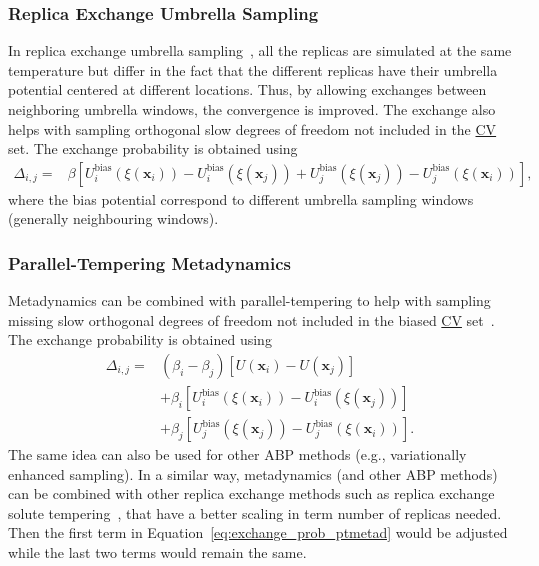 \documentclass[9pt,review]{livecoms}
\newcommand{\vx}{\mathbf{x}}
\begin{document}
\subsubsection{Replica Exchange Umbrella Sampling}
\label{sec:repex_umbrsampl}
In replica exchange umbrella sampling~\cite{Sugita2000_REUS}, all the replicas are simulated at the same temperature but differ in the fact that the different replicas have their umbrella potential centered at different locations. Thus, by allowing exchanges between neighboring umbrella windows, the convergence is improved. The exchange also helps with sampling orthogonal slow degrees of freedom not included in the \hyperlink{ref:CV} {CV} set. The exchange probability is obtained using
\begin{align}
\Delta_{i,j} = &
\beta \left[
U^{\mathrm{bias}}_{i}(\xi(\vx_{i})) - U^{\mathrm{bias}}_{i}(\xi(\vx_{j})) +
U^{\mathrm{bias}}_{j}(\xi(\vx_{j})) - U^{\mathrm{bias}}_{j}(\xi(\vx_{i}))
\right],
\end{align}
where the bias potential correspond to different umbrella sampling windows (generally neighbouring windows). 

\subsubsection{Parallel-Tempering Metadynamics}
Metadynamics can be combined with parallel-tempering to help with sampling missing slow orthogonal degrees of freedom not included in the biased \hyperlink{ref:CV} {CV} set~\cite{Bussi-JACS-2006}. The exchange probability is obtained using
\begin{align}
\label{eq:exchange_prob_ptmetad}
\Delta_{i,j} = &
\left(\beta_{i} - \beta_{j}\right)
\left[U(\vx_{i}) - U(\vx_{j})\right]
\nonumber \\ & +
\beta_{i} \left[
U^{\mathrm{bias}}_{i}(\xi(\vx_{i})) - U^{\mathrm{bias}}_{i}(\xi(\vx_{j}))
\right]
\nonumber \\ & +
\beta_{j} \left[
U^{\mathrm{bias}}_{j}(\xi(\vx_{j})) - U^{\mathrm{bias}}_{j}(\xi(\vx_{i}))
\right].
\end{align}
The same idea can also be used for other ABP methods (e.g., variationally enhanced sampling). In a similar way, metadynamics (and other ABP methods) can be combined with other replica exchange methods such as replica exchange solute tempering~\cite{REST2_Wang_2011,HREX_Bussi_2013}, that have a better scaling in term number of replicas needed. Then the first term in Equation~\ref{eq:exchange_prob_ptmetad} would be adjusted while the last two terms would remain the same.
\end{document}
